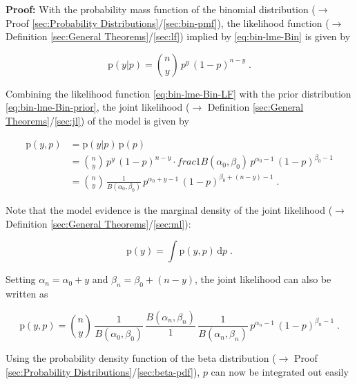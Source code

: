\documentclass[a4paper,12pt,twoside]{book}
\begin{document}
\vspace{1em}
\textbf{Proof:} With the probability mass function of the binomial distribution ($\rightarrow$ Proof \ref{sec:Probability Distributions}/\ref{sec:bin-pmf}), the likelihood function ($\rightarrow$ Definition \ref{sec:General Theorems}/\ref{sec:lf}) implied by \eqref{eq:bin-lme-Bin} is given by

\begin{equation} \label{eq:bin-lme-Bin-LF}
\mathrm{p}(y|p) = {n \choose y} \, p^y \, (1-p)^{n-y} \; .
\end{equation}

Combining the likelihood function \eqref{eq:bin-lme-Bin-LF} with the prior distribution \eqref{eq:bin-lme-Bin-prior}, the joint likelihood ($\rightarrow$ Definition \ref{sec:General Theorems}/\ref{sec:jl}) of the model is given by

\begin{equation} \label{eq:bin-lme-Bin-JL-s1}
\begin{split}
\mathrm{p}(y,p) &= \mathrm{p}(y|p) \, \mathrm{p}(p) \\
&= {n \choose y} \, p^y \, (1-p)^{n-y} \cdot frac{1}{B(\alpha_0,\beta_0)} \, p^{\alpha_0-1} \, (1-p)^{\beta_0-1} \\
&= {n \choose y} \, \frac{1}{B(\alpha_0,\beta_0)} \, p^{\alpha_0+y-1} \, (1-p)^{\beta_0+(n-y)-1} \; .
\end{split}
\end{equation}

Note that the model evidence is the marginal density of the joint likelihood ($\rightarrow$ Definition \ref{sec:General Theorems}/\ref{sec:ml}):

\begin{equation} \label{eq:bin-lme-Bin-ME-s1}
\mathrm{p}(y) = \int \mathrm{p}(y,p) \, \mathrm{d}p \; .
\end{equation}

Setting $\alpha_n = \alpha_0 + y$ and $\beta_n = \beta_0 + (n-y)$, the joint likelihood can also be written as

\begin{equation} \label{eq:bin-lme-Bin-JL-s2}
\mathrm{p}(y,p) = {n \choose y} \, \frac{1}{B(\alpha_0,\beta_0)} \, \frac{B(\alpha_n,\beta_n)}{1} \, \frac{1}{B(\alpha_n,\beta_n)} \, p^{\alpha_n-1} \, (1-p)^{\beta_n-1} \; .
\end{equation}

Using the probability density function of the beta distribution ($\rightarrow$ Proof \ref{sec:Probability Distributions}/\ref{sec:beta-pdf}), $p$ can now be integrated out easily
\end{document}
